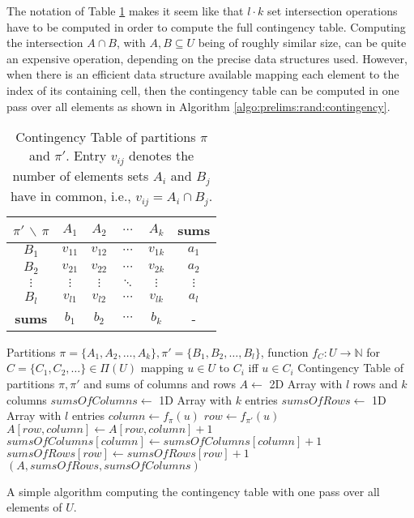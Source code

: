		The notation of Table \ref{fig:prelims:rand:contingency} makes it seem like that $l \cdot k$ set intersection operations have to be computed in order to compute the full contingency table.
		Computing the intersection $A \cap B$, with $A, B \subseteq U$ being of roughly similar size, can be quite an expensive operation, depending on the precise data structures used.
		However, when there is an efficient data structure available mapping each element to the index of its containing cell, then the contingency table can be computed in one pass over all elements as shown in Algorithm \ref{algo:prelims:rand:contingency}.
		
		\begin{table}[h!]
			\centering
			\begin{tabular}{c|cccc|c}
				$\pi'$ $\backslash$ $\pi$ & $A_1$ & $A_2$ & $\ldots$ & $A_k$ & \textbf{sums} \\
				\toprule
				$B_1$ & $v_{11}$ & $v_{12}$ & $\cdots$ & $v_{1k}$ & $a_1$ \\
				$B_2$ & $v_{21}$ & $v_{22}$ & $\cdots$ & $v_{2k}$ & $a_2$ \\
				$\vdots$ & $\vdots$ & $\vdots$ & $\ddots$ & $\vdots$ & $\vdots$\\
				$B_l$ & $v_{l1}$ & $v_{l2}$ & $\cdots$ & $v_{lk}$ & $a_l$ \\
				\midrule
				\textbf{sums} & $b_1$ & $b_2$ & $\cdots$ & $b_k$ & -
			\end{tabular}
			\caption{Contingency Table of partitions $\pi$ and $\pi'$. Entry $v_{ij}$ denotes the number of elements sets $A_i$ and $B_j$ have in common, i.e., $v_{ij} = A_i \cap B_j$.}
			\label{fig:prelims:rand:contingency}
		\end{table}
		
		\begin{algorithm}[ht!]
			\centering
			\begin{algorithmic}
				\Require Partitions $\pi = \{ A_1, A_2, \ldots, A_k \}, \pi' = \{ B_1, B_2, \ldots, B_l \}$, function $f_C: U \rightarrow \mathbb{N}$ for $C = \{ C_1, C_2, \ldots \} \in \Pi(U)$ mapping $u \in U$ to $C_i$ iff $u \in C_i$
				\Ensure Contingency Table of partitions $\pi, \pi'$ and sums of columns and rows
				\Statex
					\State $A \gets$ 2D Array with $l$ rows and $k$ columns
					\State $sumsOfColumns \gets$ 1D Array with $k$ entries
					\State $sumsOfRows \gets$ 1D Array with $l$ entries
						\State $column \gets f_\pi(u)$
						\State $row \gets f_{\pi'}(u)$
						\Statex
						\State $A[row, column] \gets A[row, column] + 1$
						\State $sumsOfColumns[column] \gets sumsOfColumns[column] + 1$
						\State $sumsOfRows[row] \gets sumsOfRows[row] + 1$
					\EndFor
					\State \Return $(A, sumsOfRows, sumsOfColumns)$
				\EndFunction
			\end{algorithmic}
			\caption{A simple algorithm computing the contingency table with one pass over all elements of $U$.}
			\label{algo:prelims:rand:contingency}
		\end{algorithm}
		
